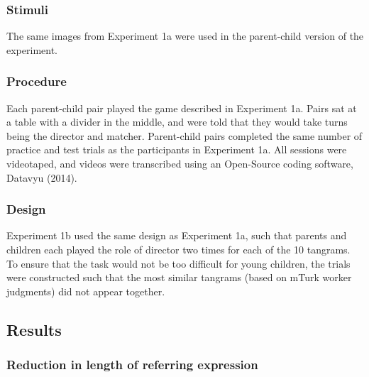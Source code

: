 \documentclass[10pt, letterpaper]{article}
\begin{document}
\hypertarget{stimuli-1}{%
\subsubsection{Stimuli}\label{stimuli-1}}

The same images from Experiment 1a were used in the parent-child version
of the experiment.

\hypertarget{procedure-1}{%
\subsubsection{Procedure}\label{procedure-1}}

Each parent-child pair played the game described in Experiment 1a. Pairs
sat at a table with a divider in the middle, and were told that they
would take turns being the director and matcher. Parent-child pairs
completed the same number of practice and test trials as the
participants in Experiment 1a. All sessions were videotaped, and videos
were transcribed using an Open-Source coding software, Datavyu (2014).

\hypertarget{design-1}{%
\subsubsection{Design}\label{design-1}}

Experiment 1b used the same design as Experiment 1a, such that parents
and children each played the role of director two times for each of the
10 tangrams. To ensure that the task would not be too difficult for
young children, the trials were constructed such that the most similar
tangrams (based on mTurk worker judgments) did not appear together.

\hypertarget{results}{%
\subsection{Results}\label{results}}

\hypertarget{reduction-in-length-of-referring-expression}{%
\subsubsection{Reduction in length of referring
expression}\label{reduction-in-length-of-referring-expression}}
\end{document}

